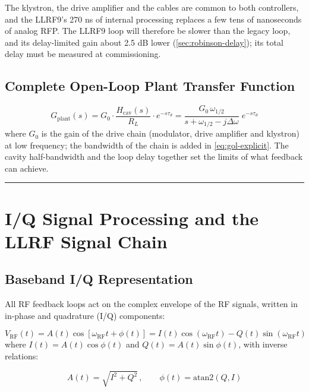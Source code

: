 The klystron, the drive amplifier and the cables are common to both controllers, and the LLRF9's 270 ns of internal processing replaces a few tens of nanoseconds of analog RFP. The LLRF9 loop will therefore be slower than the legacy loop, and its delay-limited gain about 2.5 dB lower (\cref{sec:robinson-delay}); its total delay must be measured at commissioning.

\subsection{Complete Open-Loop Plant Transfer Function}\label{sec:plant-ol}


\begin{equation}\label{eq:plant}
G_\text{plant}(s) = G_0 \cdot \frac{H_\text{cav}(s)}{R_L} \cdot e^{-s\tau_d} = \frac{G_0 \,\omega_{1/2}}{s + \omega_{1/2} - j\Delta\omega}\; e^{-s\tau_d}
\end{equation}
where \(G_0\) is the gain of the drive chain (modulator, drive amplifier and klystron) at low frequency; the bandwidth of the chain is added in \cref{eq:gol-explicit}. The cavity half-bandwidth and the loop delay together set the limits of what feedback can achieve.

\begin{center}\rule{0.5\linewidth}{0.5pt}\end{center}

\section{I/Q Signal Processing and the LLRF Signal Chain}\label{sec:iq}


\subsection{Baseband I/Q Representation}\label{sec:iq-baseband}


All RF feedback loops act on the complex envelope of the RF signals, written in in-phase and quadrature (I/Q) components:

\begin{equation}\label{eq:iq-def}
V_\text{RF}(t) =A(t)\cos[\omega_\text{RF}t + \phi(t)] = I(t)\cos(\omega_\text{RF}t) - Q(t)\sin(\omega_\text{RF}t)
\end{equation}
where \(I(t) = A(t)\cos\phi(t)\) and \(Q(t) = A(t)\sin\phi(t)\), with inverse relations:

\begin{equation}\label{eq:iq-aphi}
A(t) = \sqrt{I^2 + Q^2}\,,\qquad \phi(t) = \text{atan2}(Q, I)
\end{equation}

